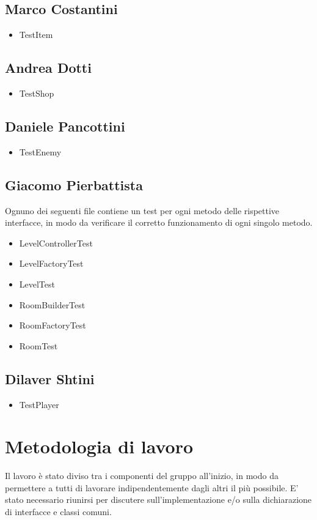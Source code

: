 \documentclass[a4paper,12pt]{report}
\begin{document}
\subsection*{Marco Costantini}
\begin{itemize}
    \item TestItem
\end{itemize}
\subsection*{Andrea Dotti}
\begin{itemize}
    \item TestShop
\end{itemize}
\subsection*{Daniele Pancottini}
\begin{itemize}
    \item TestEnemy
\end{itemize}
\subsection*{Giacomo Pierbattista}
Ognuno dei seguenti file contiene un test per ogni metodo delle rispettive interfacce, in modo da verificare
il corretto funzionamento di ogni singolo metodo.
\begin{itemize}
    \item LevelControllerTest
    \item LevelFactoryTest
    \item LevelTest
    \item RoomBuilderTest
    \item RoomFactoryTest
    \item RoomTest
\end{itemize}

\subsection*{Dilaver Shtini}
\begin{itemize}
    \item TestPlayer
\end{itemize}



\section{Metodologia di lavoro}
Il lavoro è stato diviso tra i componenti del gruppo all'inizio, in modo da permettere a tutti di
lavorare indipendentemente dagli altri il più possibile.
E' stato necessario riunirsi per discutere sull'implementazione e/o sulla dichiarazione di interfacce e
classi comuni.
\end{document}
